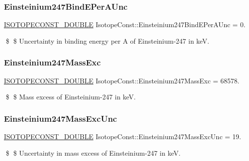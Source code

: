 \subsubsection{\texorpdfstring{Einsteinium247\+Bind\+E\+Per\+A\+Unc}{Einsteinium247BindEPerAUnc}}
{\footnotesize\ttfamily \mbox{\hyperlink{group___isotope_const-_macros_ga8f45a7272ce02c0b4c65c44636ed719a}{I\+S\+O\+T\+O\+P\+E\+C\+O\+N\+S\+T\+\_\+\+D\+O\+U\+B\+LE}} Isotope\+Const\+::\+Einsteinium247\+Bind\+E\+Per\+A\+Unc = 0.}

\$ \$ Uncertainty in binding energy per A of Einsteinium-\/247 in keV. \mbox{\label{group___isotope_const-_einsteinium-_es247_gad3102ff97cd2665095771b7418e05108}} 
\subsubsection{\texorpdfstring{Einsteinium247\+Mass\+Exc}{Einsteinium247MassExc}}
{\footnotesize\ttfamily \mbox{\hyperlink{group___isotope_const-_macros_ga8f45a7272ce02c0b4c65c44636ed719a}{I\+S\+O\+T\+O\+P\+E\+C\+O\+N\+S\+T\+\_\+\+D\+O\+U\+B\+LE}} Isotope\+Const\+::\+Einsteinium247\+Mass\+Exc = 68578.}

\$ \$ Mass excess of Einsteinium-\/247 in keV. \mbox{\label{group___isotope_const-_einsteinium-_es247_gabff537676c327bf087c19140b1f58189}} 
\subsubsection{\texorpdfstring{Einsteinium247\+Mass\+Exc\+Unc}{Einsteinium247MassExcUnc}}
{\footnotesize\ttfamily \mbox{\hyperlink{group___isotope_const-_macros_ga8f45a7272ce02c0b4c65c44636ed719a}{I\+S\+O\+T\+O\+P\+E\+C\+O\+N\+S\+T\+\_\+\+D\+O\+U\+B\+LE}} Isotope\+Const\+::\+Einsteinium247\+Mass\+Exc\+Unc = 19.}

\$ \$ Uncertainty in mass excess of Einsteinium-\/247 in keV. \mbox{\label{group___isotope_const-_einsteinium-_es247_gae4c076cff4a05f58e2dd157de63b1347}} 
